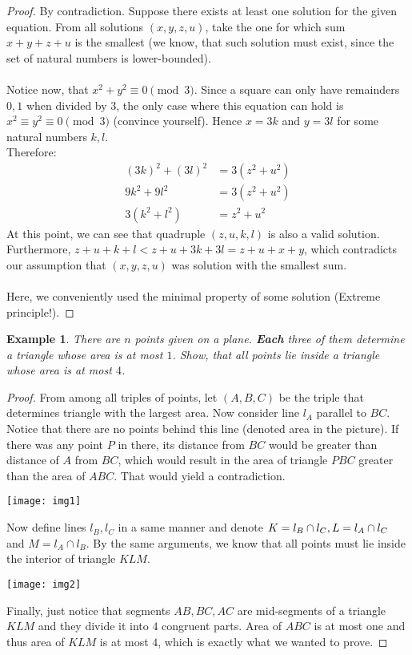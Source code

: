 \documentclass[12pt]{article}
\newtheorem{theorem}{Example}
\begin{document}
\begin{proof}
By contradiction. Suppose there exists at least one solution for the given equation. From all solutions $(x, y, z, u)$, take the one for which sum $x + y + z + u$ is the smallest (we know, that such solution must exist, since the set of natural numbers is lower-bounded). \\\\
Notice now, that $x^{2} + y^{2} \equiv 0 \pmod 3$. Since a square can only have remainders $0, 1$ when divided by $3$, the only case where this equation can hold is $x^{2} \equiv y^{2} \equiv 0 \pmod 3$ (convince yourself). Hence $x = 3k$ and $y = 3l$ for some natural numbers $k, l$. \\
Therefore: 
\begin{align*} 
{(3k)}^{2} + {(3l)}^{2} &= 3(z^{2} + u^{2})\\
9k^{2} + 9l^{2} &= 3(z^{2} + u^{2}) \\
3(k^{2} + l^{2}) &= z^{2} + u^{2}
\end{align*}
At this point, we can see that quadruple $(z, u, k, l)$ is also a valid solution. Furthermore, $z + u + k + l < z + u + 3k + 3l = z + u + x + y$, which contradicts our assumption that $(x, y, z, u)$ was solution with the smallest sum. \qedhere
\\\\
Here, we conveniently used the minimal property of some solution (Extreme principle!).
\end{proof}
\newpage
\begin{theorem}
There are $n$ points given on a plane. \textbf{Each} three of them determine a triangle whose area is at most $1$. Show, that all points lie inside a triangle whose area is at most $4$.  
\end{theorem}

\begin{proof}
From among all triples of points, let $(A, B, C)$ be the triple that determines triangle with the largest area. Now consider line $l_{A}$ parallel to $BC$. Notice that there are no points behind this line (denoted area in the picture). 
If there was any point $P$ in there, its distance from $BC$ would be greater than distance of $A$ from $BC$, which would result in the area of triangle $PBC$ greater than the area of $ABC$. That would yield a contradiction.
\begin{center}
\texttt{[image: img1]}
\end{center}
Now define lines $l_{B}, l_{C}$ in a same manner and denote $K = l_{B} \cap l_{C},\\ L = l_{A} \cap l_{C}$ and $M = l_{A} \cap l_{B}$. By the same arguments, we know that all points must lie inside the interior of triangle $KLM$. 
\begin{center}
\texttt{[image: img2]}
\end{center}
Finally, just notice that segments $AB, BC, AC$ are mid-segments of a triangle $KLM$ and they divide it into $4$ congruent parts. Area of $ABC$ is at most one and thus area of $KLM$ is at most $4$, which is exactly what we wanted to prove.
\end{proof}
\end{document}
